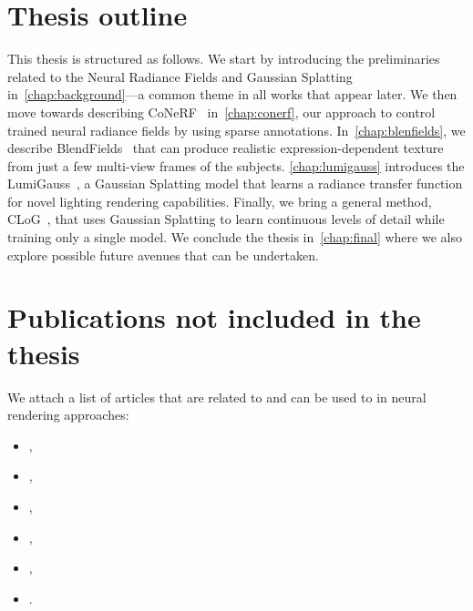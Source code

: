 \section{Thesis outline}
  This thesis is structured as follows.
  We start by introducing the preliminaries related to the Neural Radiance
  Fields and Gaussian Splatting in~\cref{chap:background}---a common theme in
  all works that appear later.
  We then move towards describing CoNeRF~\cite{kania2022conerf}
  in~\cref{chap:conerf}, our approach to control trained neural radiance
  fields by using sparse annotations.
  In~\cref{chap:blenfields}, we describe
  BlendFields~\cite{kania2023blendfields} that can produce realistic
  expression-dependent texture from just a few multi-view frames of the
  subjects.
  \cref{chap:lumigauss} introduces the LumiGauss~\cite{kaleta2024lumigauss}, a Gaussian Splatting model that learns a radiance transfer function for novel lighting rendering capabilities.
  Finally, we bring a general method, CLoG~\cite{kania2024clog}, that uses
  Gaussian Splatting to learn continuous levels of detail while training only
  a single model.
  We conclude the thesis in~\cref{chap:final} where we also explore possible
  future avenues that can be undertaken.

\section{Publications not included in the thesis}
  We attach a list of articles that are related to and can be used to in neural rendering approaches:
  \begin{itemize}
    \item\!\!\!,
    \item\!\!\!,
    \item\!\!\!\!\!,
    \item\!\!\!\!,
    \item\!\!\!,
    \item\!\!\!\!.
  \end{itemize}

